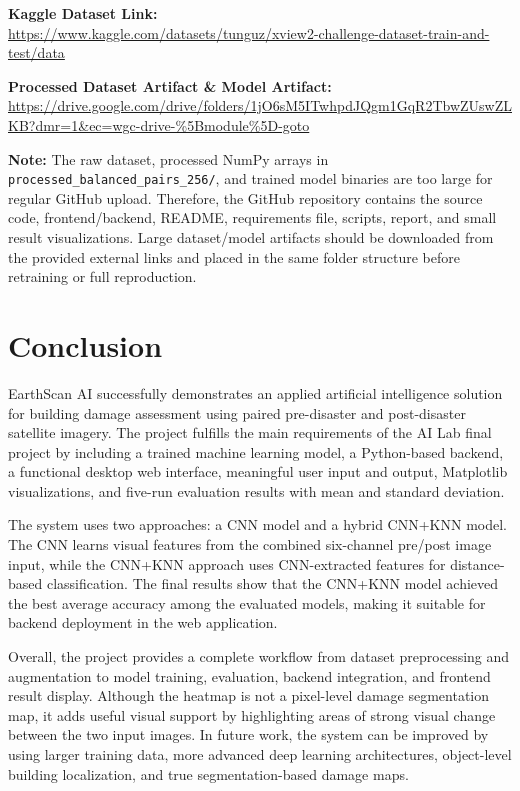 \documentclass[conference]{IEEEtran}
\begin{document}
\vspace{0.2cm}
\noindent\textbf{Kaggle Dataset Link:} \\
\url{https://www.kaggle.com/datasets/tunguz/xview2-challenge-dataset-train-and-test/data}

\vspace{0.2cm}
\noindent\textbf{Processed Dataset Artifact & Model Artifact:} \\
\url{https://drive.google.com/drive/folders/1jO6sM5ITwhpdJQgm1GqR2TbwZUswZLKB?dmr=1&ec=wgc-drive-%5Bmodule%5D-goto}


\vspace{0.2cm}
\noindent\textbf{Note:} The raw dataset, processed NumPy arrays in \texttt{processed\_balanced\_pairs\_256/}, and trained model binaries are too large for regular GitHub upload. Therefore, the GitHub repository contains the source code, frontend/backend, README, requirements file, scripts, report, and small result visualizations. Large dataset/model artifacts should be downloaded from the provided external links and placed in the same folder structure before retraining or full reproduction.

\section{Conclusion}
EarthScan AI successfully demonstrates an applied artificial intelligence solution for building damage assessment using paired pre-disaster and post-disaster satellite imagery. The project fulfills the main requirements of the AI Lab final project by including a trained machine learning model, a Python-based backend, a functional desktop web interface, meaningful user input and output, Matplotlib visualizations, and five-run evaluation results with mean and standard deviation.

The system uses two approaches: a CNN model and a hybrid CNN+KNN model. The CNN learns visual features from the combined six-channel pre/post image input, while the CNN+KNN approach uses CNN-extracted features for distance-based classification. The final results show that the CNN+KNN model achieved the best average accuracy among the evaluated models, making it suitable for backend deployment in the web application.

Overall, the project provides a complete workflow from dataset preprocessing and augmentation to model training, evaluation, backend integration, and frontend result display. Although the heatmap is not a pixel-level damage segmentation map, it adds useful visual support by highlighting areas of strong visual change between the two input images. In future work, the system can be improved by using larger training data, more advanced deep learning architectures, object-level building localization, and true segmentation-based damage maps.
\end{document}
